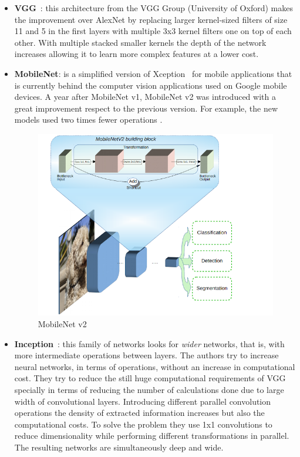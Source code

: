 \begin{itemize}
\item \textbf{VGG}~\cite{simonyan2014very}: this architecture from the VGG Group (University of Oxford) makes the improvement over AlexNet by replacing larger kernel-sized filters of size 11 and 5 in the first layers with multiple 3x3 kernel filters one on top of each other. With multiple stacked smaller kernels the depth of the network increases allowing it to learn more complex features at a lower cost.
\item \textbf{MobileNet}: is a simplified version of Xception~\cite{chollet2016xception} for mobile applications that is currently behind the computer vision applications used on Google mobile devices. A year after MobileNet v1, MobileNet v2 was introduced with a great improvement respect to the previous version. For example, the new models used two times fewer operations \cite{sandler2018mobilenetv2}.
\begin{figure}[H]
\begin{center}
\includegraphics[scale=0.45]{figures/mobilenet_v2.png}
\caption{MobileNet v2 \cite{sandler2018mobilenetv2}}
\label{fig:mobilenet}
\end{center}
\end{figure}
\item \textbf{Inception}~\cite{szegedy2015going}: this family of networks looks for \textit{wider} networks, that is, with more intermediate operations between layers. The authors try to increase neural networks, in terms of operations, without an increase in computational cost. They try to reduce the still huge computational requirements of VGG specially in terms of reducing the number of calculations done due to large width of convolutional layers. Introducing different parallel convolution operations the density of extracted information increases but also the computational costs. To solve the problem they use 1x1 convolutions to reduce dimensionality while performing different transformations in parallel. The resulting networks are simultaneously deep and wide.\\

\end{itemize}
